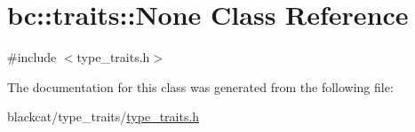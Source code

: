 \hypertarget{classbc_1_1traits_1_1None}{}\section{bc\+:\+:traits\+:\+:None Class Reference}
\label{classbc_1_1traits_1_1None}


{\ttfamily \#include $<$type\+\_\+traits.\+h$>$}



The documentation for this class was generated from the following file\+:\begin{DoxyCompactItemize}
\item 
blackcat/type\+\_\+traits/\hyperlink{type__traits_2type__traits_8h}{type\+\_\+traits.\+h}\end{DoxyCompactItemize}

